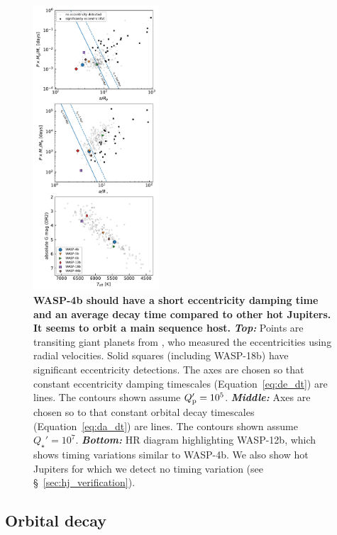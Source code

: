 \documentclass[12pt,twocolumn,tighten]{aastex62}
\begin{document}
\begin{figure}[t!]
  \begin{center}
    \includegraphics[width=0.417\textwidth]{f5.pdf}
  \end{center}
  \vspace{-0.5cm}
  \caption{
    {\bf WASP-4b should have a short eccentricity damping time and an average
    decay time compared to other hot Jupiters.  It seems to orbit a
    main sequence host.
    }
    {\bf \it Top:}
    Points are transiting giant planets from \citet{bonomo_gaps_2017},
    who measured the eccentricities using radial velocities.  Solid
    squares (including WASP-18b) have significant eccentricity
    detections.  The axes are chosen so that constant eccentricity
    damping timescales (Equation~\ref{eq:de_dt}) are lines.  The
    contours shown assume $Q_{\rm p}' = 10^5$.
    {\bf \it Middle:} 
    Axes are chosen so to that constant orbital decay timescales
    (Equation~\ref{eq:da_dt}) are lines.  The contours shown assume
    $Q_\star' = 10^7$.
    {\bf \it Bottom:}
    HR diagram highlighting WASP-12b, which shows timing variations
    similar to WASP-4b.  We also show hot Jupiters for which we
    detect no timing variation (see \S~\ref{sec:hj_verification}).
    \label{fig:context}
  }
\end{figure}

 
\subsection{Orbital decay}
\end{document}
